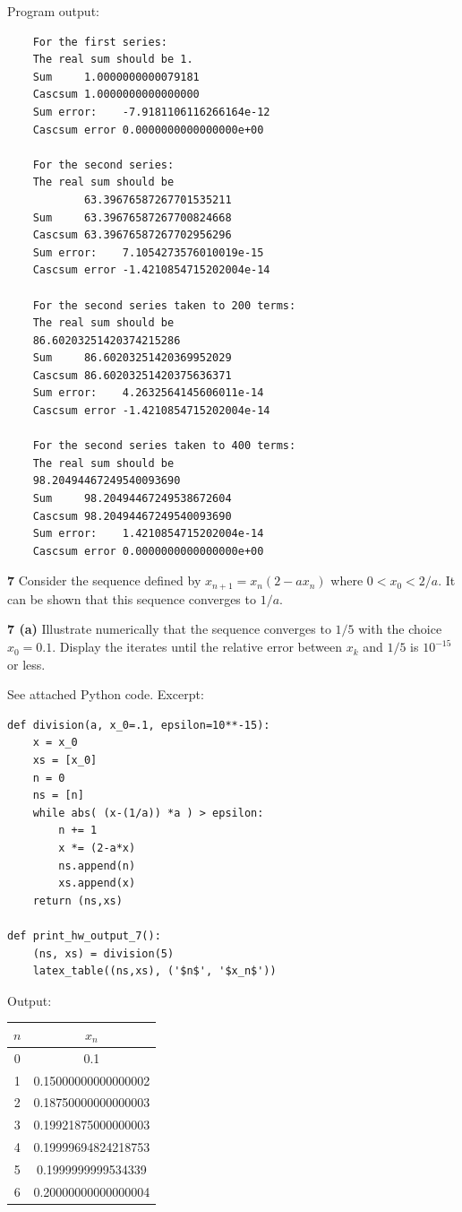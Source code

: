 \documentclass[12pt]{article}
\begin{document}
	\bigbreak
	
	Program output: \\
	\begin{verbatim}
	For the first series:
	The real sum should be 1.
	Sum     1.0000000000079181
	Cascsum 1.0000000000000000
	Sum error:    -7.9181106116266164e-12
	Cascsum error 0.0000000000000000e+00
	
	For the second series:
	The real sum should be
	        63.39676587267701535211
	Sum     63.39676587267700824668
	Cascsum 63.39676587267702956296
	Sum error:    7.1054273576010019e-15
	Cascsum error -1.4210854715202004e-14
	
	For the second series taken to 200 terms:
	The real sum should be
	86.60203251420374215286
	Sum     86.60203251420369952029
	Cascsum 86.60203251420375636371
	Sum error:    4.2632564145606011e-14
	Cascsum error -1.4210854715202004e-14
	
	For the second series taken to 400 terms:
	The real sum should be
	98.20494467249540093690
	Sum     98.20494467249538672604
	Cascsum 98.20494467249540093690
	Sum error:    1.4210854715202004e-14
	Cascsum error 0.0000000000000000e+00	
	\end{verbatim}


\hspace{-7 ex}\textbf{7} Consider the sequence defined by $x_{n+1} = x_n(2-ax_n)$ where $0<x_0<2/a$. It can be shown that this sequence converges to $1/a$.\bigbreak

\hspace{-7 ex}\textbf{7 (a)} Illustrate numerically that the sequence converges to $1/5$ with the choice $x_0 = 0.1$. Display the iterates until the relative error between $x_k$ and $1/5$ is $10^{-15}$ or less. \bigbreak

	See attached Python code.
	Excerpt: \\
	
	\begin{lstlisting}
def division(a, x_0=.1, epsilon=10**-15):
	x = x_0
	xs = [x_0]
	n = 0
	ns = [n]
	while abs( (x-(1/a)) *a ) > epsilon:
		n += 1
		x *= (2-a*x)
		ns.append(n)
		xs.append(x)
	return (ns,xs)

def print_hw_output_7():
	(ns, xs) = division(5)
	latex_table((ns,xs), ('$n$', '$x_n$'))
	\end{lstlisting}
	
	Output:\\

	\begin{center}
		\begin{tabular}{|c|c|}
			\hline
			$n$&$x_n$\\ \hline
			0&0.1\\ \hline
			1&0.15000000000000002\\ \hline
			2&0.18750000000000003\\ \hline
			3&0.19921875000000003\\ \hline
			4&0.19999694824218753\\ \hline
			5&0.1999999999534339\\ \hline
			6&0.20000000000000004\\ \hline
		\end{tabular}
	\end{center}
	
\end{document}

